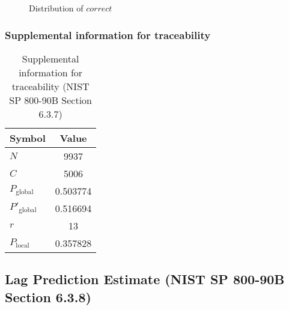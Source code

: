 \documentclass[a3paper,xelatex,english]{bxjsarticle}
\begin{document}
\begin{figure}[htbp]
\centering

\caption{Distribution of $correct$}
\end{figure}
\subsubsection{Supplemental information for traceability}
\renewcommand{\arraystretch}{1.8}
\begin{table}[h]
\caption{Supplemental information for traceability (NIST SP 800-90B Section 6.3.7)}
\begin{center}
\begin{tabular}{|l|c|}
\hline 
\rowcolor{anotherlightblue} %
Symbol				& Value \\ \hline 
$N$				& 9937\\ \hline 
$C$				& 5006\\ \hline 
$P_{\textrm{global}}$				& 0.503774\\ \hline 
$P'_{\textrm{global}}$			& 0.516694\\ \hline 
$r$				& 13\\ \hline 
$P_{\textrm{local}}$ 			& 0.357828\\ \hline
\end{tabular}
\end{center}
\end{table}
\renewcommand{\arraystretch}{1.4}
\clearpage
\subsection{Lag Prediction Estimate (NIST SP 800-90B Section 6.3.8)}\label{sec:Binary638}
\end{document}
